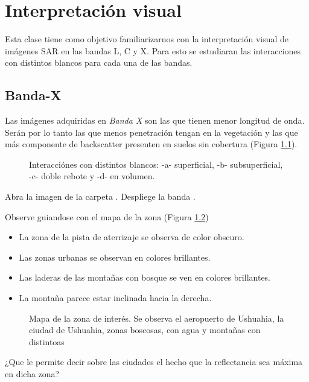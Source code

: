 \chapter{Interpretación visual}

Esta clase tiene como objetivo familiarizarnos con la interpretación visual de imágenes SAR en las bandas L, C y X. Para esto se estudiaran las interacciones con distintos blancos para cada una de las bandas.

\section{Banda-X}

Las imágenes adquiridas en \emph{Banda X} son las que tienen menor longitud de onda. Serán por lo tanto las que menos penetración tengan en la vegetación y las que más componente de backscatter presenten en suelos sin cobertura (Figura \ref{fig:bandaX}).

\begin{figure}[h!]
    \centering
    \caption{Interacciónes con distintos blancos: -a- superficial, -b- subsuperficial, -c- doble rebote y -d- en volumen.}
    \label{fig:bandaX}
\end{figure}

Abra la imagen  de la carpeta . Despliege la banda .

Observe guiandose con el mapa de la zona (Figura \ref{fig:mapa})
\begin{itemize}
    \item La zona de la pista de aterrizaje se observa de color obscuro.
    \item Las zonas urbanas se observan en colores brillantes.
    \item Las laderas de las montañas con bosque se ven en colores brillantes.
    \item La montaña parece estar inclinada hacia la derecha.
\end{itemize}

\begin{figure}[h!]
    \centering
    \caption{Mapa de la zona de interés. Se observa el aeropuerto de Ushuahia, la ciudad de Ushuahia, zonas boscosas, con agua y montañas con distintoas}
    \label{fig:mapa}
\end{figure}

\begin{que}
    ¿Que le permite decir sobre las ciudades el hecho que la reflectancia sea máxima en dicha zona?
\end{que}

